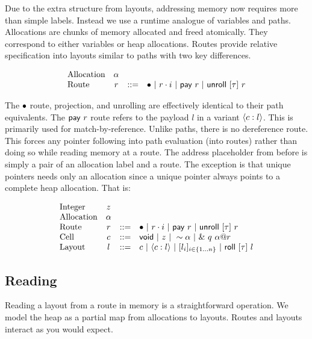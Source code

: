 Due to the extra structure from layouts, addressing memory now requires
more than simple labels. Instead we use a runtime analogue of variables and paths.
Allocations are chunks of memory allocated and freed atomically.
They correspond to either variables or heap allocations.
Routes provide relative specification into layouts similar to paths with two key differences.

\[
\begin{array}{lccl}
\textrm{Allocation} & \alpha & & \\
\textrm{Route} & r & ::= & \bullet ~|~ {r}\cdot{i} ~|~ \mathsf{pay}~{r} ~|~ \mathsf{unroll}~[{\tau}]~{r} \\
\end{array}
\]

The $\bullet$ route, projection, and unrolling are effectively identical to their path equivalents.
The $\mathsf{pay}~{r}$ route refers to the payload $l$ in a variant $\langle{{c}:{l}}\rangle$.
This is primarily used for match-by-reference.
Unlike paths, there is no dereference route.
This forces any pointer following into path evaluation (into routes)
rather than doing so while reading memory at a route.
The address placeholder from before is simply a pair of an allocation label and a route.
The exception is that unique pointers needs only an allocation since a unique pointer
always points to a complete heap allocation.
That is:

\[
\begin{array}{lccl}
\textrm{Integer} & z & & \\
\textrm{Allocation} & \alpha & & \\
\textrm{Route} & r & ::= & \bullet ~|~ {r}\cdot{i} ~|~ \mathsf{pay}~{r} ~|~ \mathsf{unroll}~[{\tau}]~{r} \\
\textrm{Cell} & c & ::= & \mathsf{void} ~|~ z ~|~ 
			      \sim{\alpha} ~|~ \&~{{q}~{{\alpha}@{r}}} \\
\textrm{Layout} & l & ::= & c ~|~ \langle{{c}:{l}}\rangle ~|~ 
			       [{{l}_{i}}]_{{i} \in \{1 \ldots {n}\} } ~|~ \mathsf{roll}~[{\tau}]~{l} \\
\end{array}
\]

\subsection*{Reading}

Reading a layout from a route in memory is a straightforward operation.
We model the heap as a partial map from allocations to layouts.
Routes and layouts interact as you would expect.

